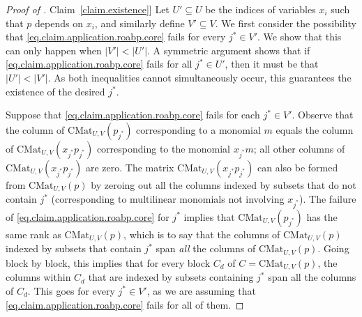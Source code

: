 \documentclass[11pt]{article}
\numberwithin{equation}{section}
\theoremstyle{definition}
\theoremstyle{plain}
\newcommand{\expref}[2]{\hyperref[#2]{#1~\ref{#2}}}
\newcommand{\CMat}[2]{\mathrm{CMat}_{#1,#2}}
\begin{document}
  \begin{proof}[Proof of \expref{Claim}{claim.existence}]
  Let \(U'\subseteq U\) be the indices of variables \(x_i\) such that \(p\)
  depends on \(x_i\),
  and similarly define \(V'\subseteq V\).
  We first consider the possibility that
  \eqref{eq.claim.application.roabp.core} fails for every
  \(j^* \in V'\).
  We show that this can only happen when \(|V'| < |U'|\).
  A symmetric argument shows that if \eqref{eq.claim.application.roabp.core}
  fails for all \(j^* \in U'\),
  then it must be that \(|U'| < |V'|\).
  As both inequalities cannot simultaneously occur,
  this guarantees the existence of the desired \(j^*\).

  Suppose that \eqref{eq.claim.application.roabp.core} fails
  for each \(j^* \in V'\).
  Observe that the column of \(\CMat{U}{V}(p_{j^*})\) corresponding to a
  monomial $m$ equals the column of \(\CMat{U}{V}(x_{j^*} p_{j^*})\)
  corresponding to the monomial $x_{j^*} m$;
  all other columns of \(\CMat{U}{V}(x_{j^*} p_{j^*})\) are zero.
  The matrix \(\CMat{U}{V}(x_{j^*} p_{j^*})\) can also be formed from
  \(\CMat{U}{V}(p)\) by zeroing out all the columns indexed by subsets that do
  not contain $j^*$
  (corresponding to multilinear monomials not involving \(x_{j^*}\)).
  The failure of \eqref{eq.claim.application.roabp.core} for \(j^*\) implies
  that \(\CMat{U}{V}(p_{j^*})\) has the same rank as \(\CMat{U}{V}(p)\),
  which is to say that the columns of \(\CMat{U}{V}(p)\) indexed by subsets
  that contain $j^*$ span \emph{all} the columns of \(\CMat{U}{V}(p)\).
  Going block by block,
  this implies that for every block \(C_d\) of \(C = \CMat{U}{V}(p)\),
  the columns within \(C_d\) that are indexed by subsets containing $j^*$ span
  all the columns of \(C_d\).
  This goes for every \(j^* \in V'\),
  as we are assuming that \eqref{eq.claim.application.roabp.core} fails for
  all of them.


\end{proof}
\end{document}

